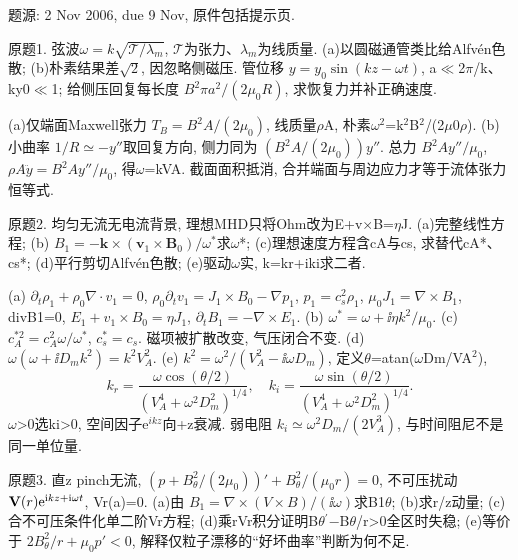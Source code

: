 题源: 2 Nov 2006, due 9 Nov, 原件包括提示页.
\begin{exercise}\label{ex:06-6-1}
原题1. 弦波$\omega=k\sqrt{\mathcal T/\lambda_m}$, $\mathcal T$为张力、$\lambda_m$为线质量. (a)以圆磁通管类比给Alfv\'en色散; (b)朴素结果差\ensuremath{\sqrt2}, 因忽略侧磁压. 管位移 $y=y_0\sin(kz-\omega t)$, a\ensuremath{\ll}2\ensuremath{\pi}/k、ky0\ensuremath{\ll}1; 给侧压回复每长度 $B^2\pi a^2/(2\mu_0R)$, 求恢复力并补正确速度.
\end{exercise}
\begin{solution}
(a)仅端面Maxwell张力 $T_B=B^2A/(2\mu_0)$, 线质量\ensuremath{\rho}A, 朴素\ensuremath{\omega}\ensuremath{{}^{2}}=k\ensuremath{{}^{2}}B\ensuremath{{}^{2}}/(2\ensuremath{\mu}0\ensuremath{\rho}). (b)小曲率 $1/R\simeq-y''$取回复方向, 侧力同为 $(B^2A/(2\mu_0))y''$. 总力 $B^2Ay''/\mu_0$, $\rho A\ddot y=B^2Ay''/\mu_0$, 得\ensuremath{\omega}=kVA. 截面面积抵消, 合并端面与周边应力才等于流体张力恒等式.
\end{solution}
\begin{exercise}\label{ex:06-6-2}
原题2. 均匀无流无电流背景, 理想MHD只将Ohm改为E+v\ensuremath{\times}B=\ensuremath{\eta}J. (a)完整线性方程; (b) $B_1=-\mathbf k\times(\mathbf v_1\times\mathbf B_0)/\omega^*$求\ensuremath{\omega}*; (c)理想速度方程含cA与cs, 求替代cA*、cs*; (d)平行剪切Alfv\'en色散; (e)驱动\ensuremath{\omega}实, k=kr+iki求二者.
\end{exercise}
\begin{solution}
(a) $\partial_t\rho_1+\rho_0\nabla\cdot v_1=0$, $\rho_0\partial_tv_1=J_1\times B_0-\nabla p_1$, $p_1=c_s^2\rho_1$, $\mu_0J_1=\nabla\times B_1$, divB1=0, $E_1+v_1\times B_0=\eta J_1$, $\partial_tB_1=-\nabla\times E_1$. (b) $\omega^*=\omega+\ii\eta k^2/\mu_0$. (c) $c_A^{*2}=c_A^2\omega/\omega^*$, $c_s^*=c_s$. 磁项被扩散改变, 气压闭合不变. (d) $\omega(\omega+\ii D_mk^2)=k^2V_A^2$. (e) $k^2=\omega^2/(V_A^2-\ii\omega D_m)$, 定义\ensuremath{\theta}=atan(\ensuremath{\omega}Dm/VA\ensuremath{{}^{2}}),
\begin{equation}
 k_r=\frac{\omega\cos(\theta/2)}{(V_A^4+\omega^2D_m^2)^{1/4}},\quad
 k_i=\frac{\omega\sin(\theta/2)}{(V_A^4+\omega^2D_m^2)^{1/4}}.
\end{equation}
\ensuremath{\omega}>0选ki>0, 空间因子e$^{ikz}$向+z衰减. 弱电阻 $k_i\simeq\omega^2D_m/(2V_A^3)$, 与时间阻尼不是同一单位量.
\end{solution}
\begin{exercise}\label{ex:06-6-3}
原题3. 直z pinch无流, $(p+B_\theta^2/(2\mu_0))'+B_\theta^2/(\mu_0r)=0$, 不可压扰动 $\mathbf V(r)\mathrm e^{\mathrm i kz+\mathrm i\omega t}$, Vr(a)=0. (a)由 $B_1=\nabla\times(V\times B)/(\ii\omega)$求B1\ensuremath{\theta}; (b)求r/z动量; (c)合不可压条件化单二阶Vr方程; (d)乘rVr积分证明B\ensuremath{\theta}\ensuremath{{}^{\prime}}\ensuremath{-}B\ensuremath{\theta}/r>0全区时失稳; (e)等价于 $2B_\theta^2/r+\mu_0p'<0$, 解释仅粒子漂移的``好坏曲率''判断为何不足.
\end{exercise}
